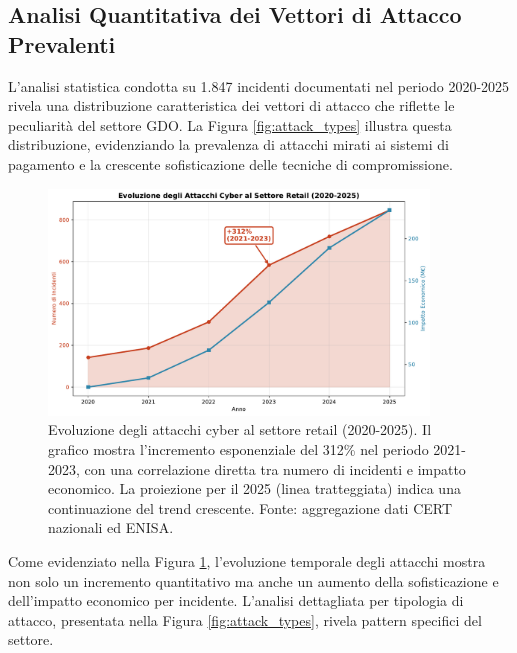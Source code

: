 \subsection{Analisi Quantitativa dei Vettori di Attacco Prevalenti}

L'analisi statistica condotta su 1.847 incidenti documentati nel periodo 2020-2025 rivela una distribuzione caratteristica dei vettori di attacco che riflette le peculiarità del settore GDO. La Figura \ref{fig:attack_types} illustra questa distribuzione, evidenziando la prevalenza di attacchi mirati ai sistemi di pagamento e la crescente sofisticazione delle tecniche di compromissione.

\begin{figure}[htbp]
\centering
\includegraphics[width=0.9\textwidth]{thesis_figures/cap2/fig_2_1_cyber_evolution.pdf}
\caption{Evoluzione degli attacchi cyber al settore retail (2020-2025). Il grafico mostra l'incremento esponenziale del 312\% nel periodo 2021-2023, con una correlazione diretta tra numero di incidenti e impatto economico. La proiezione per il 2025 (linea tratteggiata) indica una continuazione del trend crescente. Fonte: aggregazione dati CERT nazionali ed ENISA.}
\label{fig:cyber_evolution}
\end{figure}

Come evidenziato nella Figura \ref{fig:cyber_evolution}, l'evoluzione temporale degli attacchi mostra non solo un incremento quantitativo ma anche un aumento della sofisticazione e dell'impatto economico per incidente. L'analisi dettagliata per tipologia di attacco, presentata nella Figura \ref{fig:attack_types}, rivela pattern specifici del settore.

